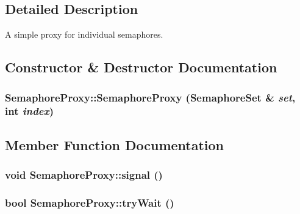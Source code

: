 \subsection{Detailed Description}
A simple proxy for individual semaphores. 

\subsection{Constructor \& Destructor Documentation}
\hypertarget{classSemaphoreProxy_3e2bbed3c0aebe14a1f5f529297df0f6}{
\subsubsection[{SemaphoreProxy}]{\setlength{\rightskip}{0pt plus 5cm}SemaphoreProxy::SemaphoreProxy ({\bf SemaphoreSet} \& {\em set}, \/  int {\em index})}}
\label{classSemaphoreProxy_3e2bbed3c0aebe14a1f5f529297df0f6}




\subsection{Member Function Documentation}
\hypertarget{classSemaphoreProxy_480137f286fec8251c8af8cb97948e19}{
\subsubsection[{signal}]{\setlength{\rightskip}{0pt plus 5cm}void SemaphoreProxy::signal ()}}
\label{classSemaphoreProxy_480137f286fec8251c8af8cb97948e19}


\hypertarget{classSemaphoreProxy_5c0aac2bf4ac6b80dfa38145f75b9d37}{
\subsubsection[{tryWait}]{\setlength{\rightskip}{0pt plus 5cm}bool SemaphoreProxy::tryWait ()}}
\label{classSemaphoreProxy_5c0aac2bf4ac6b80dfa38145f75b9d37}


